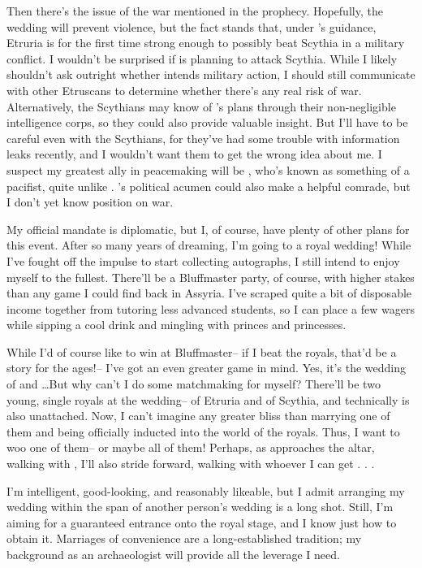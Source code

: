 \documentclass[char]{Kos}
\begin{document}
Then there's the issue of the war mentioned in the prophecy. Hopefully, the wedding will prevent violence, but the fact stands that, under \cEtruriaKing{}'s guidance, Etruria is for the first time strong enough to possibly beat Scythia in a military conflict. I wouldn't be surprised if \cEtruriaKing{} is planning to attack Scythia. While I likely shouldn't ask \cEtruriaKing{\them} outright whether \cEtruriaKing{\they} intends military action, I should still communicate with other Etruscans to determine whether there's any real risk of war. Alternatively, the Scythians may know of \cEtruriaKing{}'s plans through their non-negligible intelligence corps, so they could also provide valuable insight. But I'll have to be careful even with the Scythians, for they've had some trouble with information leaks recently, and I wouldn't want them to get the wrong idea about me. I suspect my greatest ally in peacemaking will be \cGroom{\Prince} \cGroom{}, who's known as something of a pacifist, quite unlike \cGroom{\their} \cEtruriaKing{\parent}. \cBride{}'s political acumen could also make \cBride{\them} a helpful comrade, but I don't yet know \cBride{\their} position on war.

My official mandate is diplomatic, but I, of course, have plenty of other plans for this event. After so many years of dreaming, I'm going to a royal wedding! While I've fought off the impulse to start collecting autographs, I still intend to enjoy myself to the fullest. There'll be a Bluffmaster party, of course, with higher stakes than any game I could find back in Assyria. I've scraped quite a bit of disposable income together from tutoring less advanced students, so I can place a few wagers while sipping a cool drink and mingling with princes and princesses.

While I'd of course like to win at Bluffmaster-- if I beat the royals, that'd be a story for the ages!-- I've got an even greater game in mind. Yes, it's the wedding of \cBride{} and \cGroom{}\ldots But why can't I do some matchmaking for myself? There'll be two young, single royals at the wedding-- \cPoet{} of Etruria and \cWard{} of Scythia, and technically \cEtruriaKing{} is also unattached. Now, I can't imagine any greater bliss than marrying one of them and being officially inducted into the world of the royals. Thus, I want to woo one of them-- or maybe all of them! Perhaps, as \cBride{} approaches the altar, walking with \cGroom{}, I'll also stride forward, walking with whoever I can get . . .

I'm intelligent, good-looking, and reasonably likeable, but I admit arranging my wedding within the span of another person's wedding is a long shot. Still, I'm aiming for a guaranteed entrance onto the royal stage, and I know just how to obtain it. Marriages of convenience are a long-established tradition; my background as an archaeologist will provide all the leverage I need.
\end{document}
